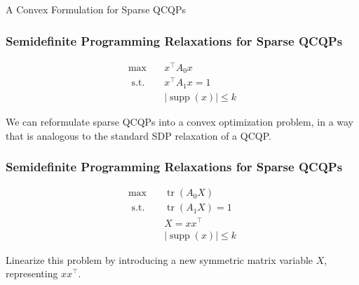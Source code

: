 \documentclass{beamer}
\DeclareMathOperator*{\supp}{supp}
\DeclareMathOperator{\tr}{tr}
\newcommand{\st}{{\text{ s.t. }}}
\begin{document}
\begin{frame}
    \centering
    \huge
    {\color{gray}A Convex Formulation for Sparse QCQPs}
\end{frame}
\begin{frame}
\frametitle{Semidefinite Programming Relaxations for Sparse QCQPs}
    \begin{equation*}
        \begin{aligned}
            \max\quad & x^{\intercal}A_0x\\
            \st & x^{\intercal}A_1x = 1\\
                &|\supp(x)| \le k
        \end{aligned}
    \end{equation*}

    We can reformulate sparse QCQPs into a convex optimization problem, in a way that is analogous to the standard SDP relaxation of a QCQP.
\end{frame}
\begin{frame}
\frametitle{Semidefinite Programming Relaxations for Sparse QCQPs}
    \begin{equation*}
        \begin{aligned}
            \max\quad & \tr(A_0X)\\
            \st & \tr(A_1X) = 1\\
                & X = xx^{\intercal}\\
                &|\supp(x)| \le k
        \end{aligned}
    \end{equation*}

    Linearize this problem by introducing a new symmetric matrix variable $X$, representing $xx^{\intercal}$.
\end{frame}
\end{document}
